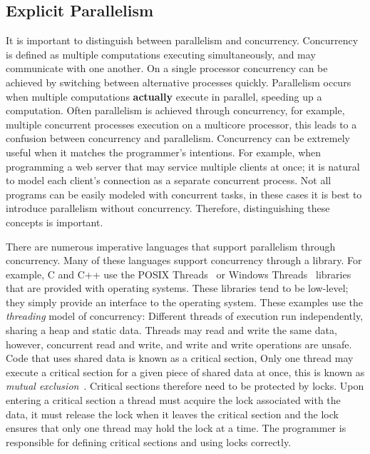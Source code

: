 
%

\subsection{Explicit Parallelism}
\label{sec:back_par_explicit}

It is important to distinguish between parallelism and concurrency.
Concurrency is defined as multiple computations executing simultaneously,
and may communicate with one another.
On a single processor concurrency can be achieved by switching between
alternative processes quickly.
Parallelism occurs when multiple computations \textbf{actually} execute in parallel,
speeding up a computation.
Often parallelism is achieved through concurrency,
for example, multiple concurrent processes execution on a multicore processor,
this leads to a confusion between concurrency and parallelism.
Concurrency can be extremely useful when it matches the programmer's intentions.
For example,
when programming a web server that may service multiple clients at once;
it is natural to model each client's connection as a separate concurrent process.
Not all programs can be easily modeled with concurrent tasks,
in these cases it is best to introduce parallelism without concurrency.
Therefore, distinguishing these concepts is important.

There are numerous imperative languages that support parallelism through
concurrency.
Many of these languages support concurrency through a library.
For example, 
C and C++ use the POSIX Threads~\cite{pthreads} or Windows
Threads~\cite{winthreads} libraries that are provided with operating systems.
These libraries tend to be low-level;
they simply provide an interface to the operating system.
These examples use the \emph{threading} model of concurrency:
Different threads of execution run independently,
sharing a heap and static data.
Threads may read and write the same data,
however,
concurrent read and write, and write and write operations are unsafe.
Code that uses shared data is known as a critical section,
Only one thread may execute a critical section for a given piece of shared data
at once,
this is known as \emph{mutual exclusion}~\cite{dijkstra:mutex}.
Critical sections therefore need to be protected by locks.
Upon entering a critical section a thread must acquire the lock associated with
the data,
it must release the lock when it leaves the critical section and the lock
ensures that only one thread may hold the lock at a time.
The programmer is responsible for defining critical sections and using locks
correctly.

